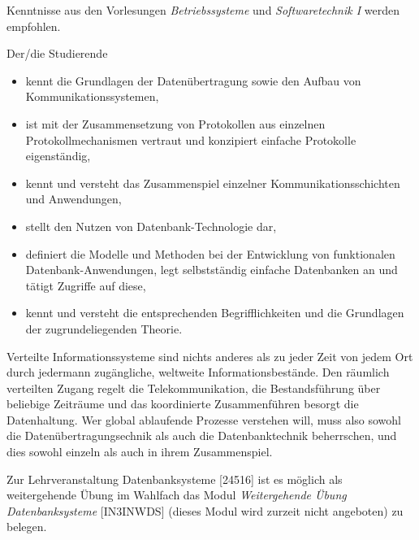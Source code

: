 \begin{module}
\begin{styleenv}
\begin{recommendations}Kenntnisse aus den Vorlesungen \emph{Betriebssysteme} und \emph{Softwaretechnik I }werden empfohlen.

\end{recommendations}
\end{styleenv}

\begin{learningoutcomes}
Der/die Studierende

 \begin{itemize}\item kennt die Grundlagen der Datenübertragung sowie den Aufbau von Kommunikationssystemen,  \item ist mit der Zusammensetzung von Protokollen aus einzelnen Protokollmechanismen vertraut und konzipiert einfache Protokolle eigenständig,  \item kennt und versteht das Zusammenspiel einzelner Kommunikationsschichten und Anwendungen,  \item stellt den Nutzen von Datenbank-Technologie dar,  \item definiert die Modelle und Methoden bei der Entwicklung von funktionalen Datenbank-Anwendungen, legt selbstständig einfache Datenbanken an und tätigt Zugriffe auf diese,  \item kennt und versteht die entsprechenden Begrifflichkeiten und die Grundlagen der zugrundeliegenden Theorie.  \end{itemize}
\end{learningoutcomes}

\begin{content}
Verteilte Informationssysteme sind nichts anderes als zu jeder Zeit von jedem Ort durch jedermann zugängliche, weltweite Informationsbestände. Den räumlich verteilten Zugang regelt die Telekommunikation, die Bestandsführung über beliebige Zeiträume und das koordinierte Zusammenführen besorgt die Datenhaltung. Wer global ablaufende Prozesse verstehen will, muss also sowohl die Datenübertragungsechnik als auch die Datenbanktechnik beherrschen, und dies sowohl einzeln als auch in ihrem Zusammenspiel.


\end{content}

\begin{remarks}Zur Lehrveranstaltung Datenbanksysteme [24516] ist es möglich als weitergehende Übung im Wahlfach das Modul \emph{Weitergehende Übung Datenbanksysteme} [IN3INWDS] (dieses Modul wird zurzeit nicht angeboten) zu belegen.

\end{remarks}

\end{module}

